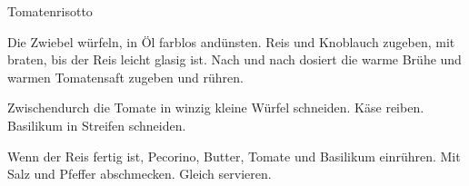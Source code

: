 \begin{recipe}{Tomatenrisotto}
    
    \begin{ingredients}
    \end{ingredients}

    \begin{instructions}
        Die Zwiebel würfeln, in Öl farblos andünsten.
        Reis und Knoblauch zugeben, mit braten, bis der Reis leicht glasig ist.
        Nach und nach dosiert die warme Brühe und warmen Tomatensaft zugeben und rühren.

        Zwischendurch die Tomate in winzig kleine Würfel schneiden.
        Käse reiben.
        Basilikum in Streifen schneiden.

        Wenn der Reis fertig ist, Pecorino, Butter, Tomate und Basilikum einrühren.
        Mit Salz und Pfeffer abschmecken.
        Gleich servieren. 
    \end{instructions}
\end{recipe}
